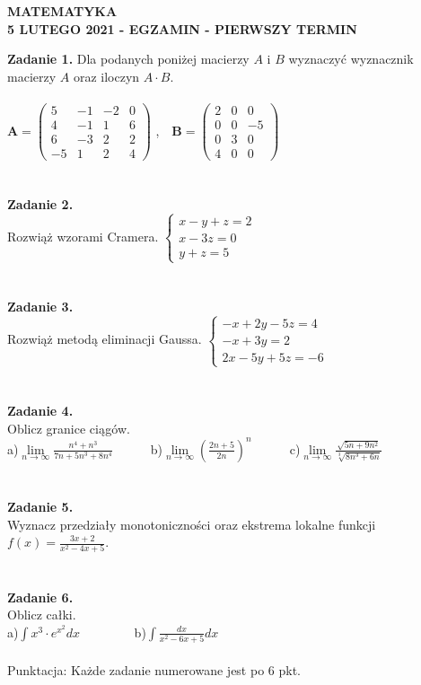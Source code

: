 \documentclass[12pt,a4paper]{report}
\begin{document}
\begin{center}

\textbf{MATEMATYKA \\5 LUTEGO 2021 - EGZAMIN - PIERWSZY TERMIN}

\end{center}\textbf{Zadanie 1.} Dla podanych poniżej macierzy $A$ i $B$ wyznaczyć wyznacznik macierzy $A$ oraz iloczyn $A\cdot B$. \\\\ $\mathbf{A} =\left( \begin{array}{cccc}5 & -1& -2 & 0\\4 & -1&1 & 6\\6 & -3& 2 & 2\\-5 & 1 & 2 & 4 \end{array} \right)$ ,\ \ $\mathbf{B} =\left( \begin{array}{ccc}2 & 0& 0\\0 & 0& -5\\0 & 3& 0\\4 & 0& 0\end{array} \right)$\\\\\\\textbf{Zadanie 2.}  \\Rozwiąż wzorami Cramera. $\left\{ \begin{array}{ll}x-y+z=2\\x-3z=0\\y+z=5\end{array}\right.$\\\\\\\textbf{Zadanie 3.}  \\Rozwiąż metodą eliminacji Gaussa. $\left\{ \begin{array}{ll}-x+2y-5z=4\\-x+3y=2\\2x-5y+5z=-6\end{array} \right.$\\\\\\\textbf{Zadanie 4.}\\Oblicz granice ciągów.\\a)$\lim\limits_{n\to\infty}\frac{n^4+n^3}{7n+5n^3+8n^4}$\ \ \ \ \ \  b)$\lim\limits_{n\to \infty}(\frac{2n+5}{2n})^n$\ \ \ \ \ \ c)$\lim\limits_{n\to\infty} \frac{\sqrt{5n+9n^2}}{\sqrt[3]{8n^3+6n}}$\\\\\\\textbf{Zadanie 5.} \\Wyznacz przedziały monotoniczności oraz ekstrema lokalne funkcji $f(x)=\frac{3x+2}{x^2-4x+5}$.\\\\\\\textbf{Zadanie 6.} \\Oblicz całki. \\a)$\int x^3\cdot e^{x^2} dx$ \ \ \ \ \ \ \ \ b)$\int \frac{dx}{x^2-6x+5} dx$\\\\Punktacja: Każde zadanie numerowane jest po 6 pkt.
\end{document}
